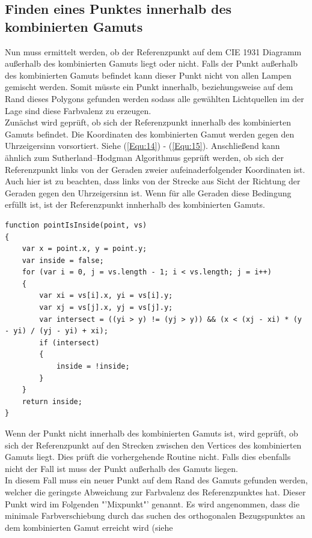 \documentclass[11pt]{scrartcl}
\begin{document}
\subsection{Finden eines Punktes innerhalb des kombinierten Gamuts}
Nun muss ermittelt werden, ob der Referenzpunkt auf dem CIE 1931 Diagramm außerhalb des kombinierten Gamuts liegt oder nicht. Falls der Punkt außerhalb des
kombinierten Gamuts befindet kann dieser Punkt nicht von allen Lampen gemischt werden. Somit müsste ein Punkt innerhalb, beziehungsweise auf dem Rand
dieses Polygons gefunden werden sodass alle gewählten Lichtquellen im der Lage sind diese Farbvalenz zu erzeugen.\\
Zunächst wird geprüft, ob sich der Referenzpunkt innerhalb des kombinierten Gamuts befindet. Die Koordinaten des kombinierten Gamut werden gegen den
Uhrzeigersinn vorsortiert. Siehe (\ref{Equ:14}) - (\ref{Equ:15}). Anschließend kann ähnlich zum Sutherland–Hodgman Algorithmus geprüft werden, ob sich
der Referenzpunkt links von der Geraden zweier aufeinaderfolgender Koordinaten ist. Auch hier ist zu beachten, dass links von der Strecke aus Sicht der
Richtung der Geraden gegen den Uhrzeigersinn ist. Wenn für alle Geraden diese Bedingung erfüllt ist, ist der Referenzpunkt innherhalb des kombinierten
Gamuts.\\
\begin{lstlisting}[caption=Punkt in Polygon Check]
function pointIsInside(point, vs)
{
    var x = point.x, y = point.y;
    var inside = false;
    for (var i = 0, j = vs.length - 1; i < vs.length; j = i++)
    {
        var xi = vs[i].x, yi = vs[i].y;
        var xj = vs[j].x, yj = vs[j].y;
        var intersect = ((yi > y) != (yj > y)) && (x < (xj - xi) * (y - yi) / (yj - yi) + xi);
        if (intersect)
        {
            inside = !inside;
        }
    }
    return inside;
}
\end{lstlisting}
Wenn der Punkt nicht innerhalb des kombinierten Gamuts ist, wird geprüft, ob sich der Referenzpunkt auf den Strecken zwischen den Vertices des kombinierten
Gamuts liegt. Dies prüft die vorhergehende Routine nicht. Falls dies ebenfalls nicht der Fall ist muss der Punkt außerhalb des Gamuts liegen.\\
In diesem Fall muss ein neuer Punkt auf dem Rand des Gamuts gefunden werden, welcher die geringste Abweichung zur Farbvalenz des Referenzpunktes hat. Dieser
Punkt wird im Folgenden "'Mixpunkt"' genannt.
Es wird angenommen, dass die minimale Farbverschiebung durch das suchen des orthogonalen Bezugspunktes an dem kombinierten Gamut erreicht wird (siehe
\end{document}
